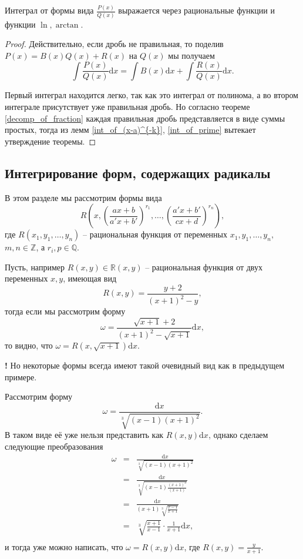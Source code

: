 \begin{theorem}\label{int_of_rational}
    Интеграл от формы вида $\frac{P(x)}{Q(x)}$ выражается через рациональные функции и функции $\ln, \arctan.$ 
\end{theorem}

\begin{proof}
    Действительно, если дробь не правильная, то поделив $P(x) = B(x) Q(x) + R(x)$ на $Q(x)$ мы получаем
    \[
     \int \frac{P(x)}{Q(x)}\mathrm{d}x = \int B(x)\mathrm{d}x + \int \frac{R(x)}{Q(x)}\mathrm{d}x.
    \]

Первый интеграл находится легко, так как это интеграл от полинома, а во втором интеграле присутствует уже правильная дробь. Но согласно теореме \ref{decomp_of_fraction} каждая правильная дробь представляется в виде суммы простых, тогда из лемм \ref{int_of_(x-a)^{-k}}, \ref{int_of_prime} вытекает утверждение теоремы.    
\end{proof}

\subsection{Интегрирование форм, содержащих радикалы}

В этом разделе мы рассмотрим формы вида 
\[
 R\left(x, \left(\frac{ax+b}{a'x+b'} \right)^{r_1}, \ldots, \left(\frac{a'x+b'}{cx+d} \right)^{r_n} \right),
\]
где $R(x_1,y_1,\ldots, y_n)$ -- рациональная функция от переменных $x_1,y_1,\ldots, y_n,$ $m,n \in \mathbb{Z}$, а $r_i, p \in \mathbb{Q}.$ 

\begin{example}
 Пусть, например $R(x,y) \in \mathbb{R}(x,y)$ -- рациональная функция от двух переменных $x,y$, имеющая вид
\[
 R(x,y) = \frac{y+2}{(x+1)^2 -y},
\]
тогда если мы рассмотрим форму
\[
 \omega = \frac{\sqrt{x+1}  +2}{(x+1)^2 - \sqrt{x+1}}\mathrm{d}x,
\]
то видно, что $\omega = R(x, \sqrt{x+1})\mathrm{d}x.$
\end{example}

\begin{mydanger}{\bf !}
    Но некоторые формы всегда имеют такой очевидный вид как в предыдущем примере.
\end{mydanger}

\begin{example}
    Рассмотрим форму
    \[
     \omega = \frac{\mathrm{d}x}{\sqrt[3]{(x-1)(x+1)^2}}.
    \]
    В таком виде её уже нельзя представить как $R(x,y)\mathrm{d}x$, однако сделаем следующие преобразования
    \begin{eqnarray*}
     \omega  &=&  \frac{\mathrm{d}x}{\sqrt[3]{(x-1)(x+1)^2}} \\
     &=&  \frac{\mathrm{d}x}{\sqrt[3]{(x-1)\frac{(x+1)^3}{(x+1)} }} \\
     &=&  \frac{\mathrm{d}x}{(x+1) {\sqrt[3]{\frac{x-1}{x+1}}}} \\
     &=& \sqrt[3]{\frac{x+1}{x-1}}\cdot \frac{1}{x+1}\mathrm{d}x, \\
    \end{eqnarray*}
и тогда уже можно написать, что $\omega = R(x,y)\mathrm{d}x$, где $R(x,y) = \frac{y}{x+1}$.
\end{example}

